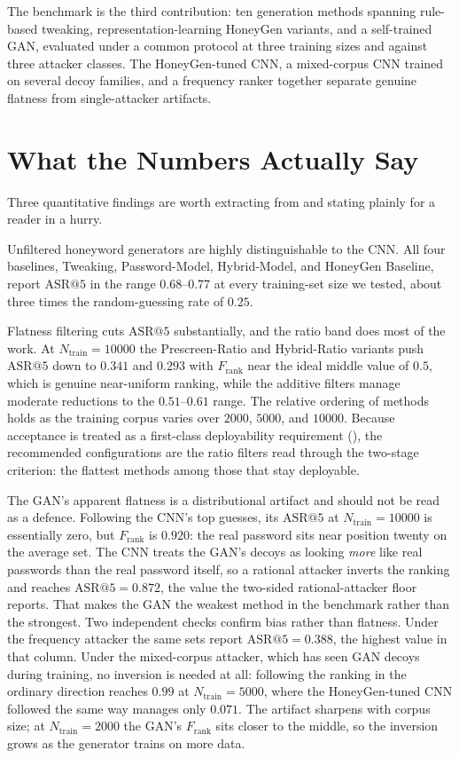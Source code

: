 The benchmark is the third contribution: ten generation methods spanning
rule-based tweaking, representation-learning HoneyGen variants, and a
self-trained GAN, evaluated under a common protocol at three training
sizes and against three attacker classes. The HoneyGen-tuned CNN, a
mixed-corpus CNN trained on several decoy families, and a frequency
ranker together separate genuine flatness from single-attacker
artifacts.

\section{What the Numbers Actually Say}

Three quantitative findings are worth extracting from 
and stating plainly for a reader in a hurry.

Unfiltered honeyword generators are highly distinguishable to the CNN.
All four baselines, Tweaking, Password-Model, Hybrid-Model, and HoneyGen
Baseline, report $\mathrm{ASR}@5$ in the range $0.68$--$0.77$ at every
training-set size we tested, about three times the random-guessing rate
of $0.25$.

Flatness filtering cuts $\mathrm{ASR}@5$ substantially, and the ratio
band does most of the work. At $N_{\text{train}} = 10000$ the
Prescreen-Ratio and Hybrid-Ratio variants push $\mathrm{ASR}@5$ down to
$0.341$ and $0.293$ with $F_{\text{rank}}$ near the ideal middle value
of $0.5$, which is genuine near-uniform ranking, while the additive
filters manage moderate reductions to the $0.51$--$0.61$ range. The
relative ordering of methods holds as the training corpus varies over
$2000$, $5000$, and $10000$. Because acceptance is treated as a
first-class deployability requirement (), the
recommended configurations are the ratio filters read through the
two-stage criterion: the flattest methods among those that stay
deployable.

The GAN's apparent flatness is a distributional artifact and should not
be read as a defence. Following the CNN's top guesses, its
$\mathrm{ASR}@5$ at $N_{\text{train}} = 10000$ is essentially zero, but
$F_{\text{rank}}$ is $0.920$: the real password sits near position
twenty on the average set. The CNN treats the GAN's decoys as looking
\emph{more} like real passwords than the real password itself, so a
rational attacker inverts the ranking and reaches
$\mathrm{ASR}@5 = 0.872$, the value the two-sided rational-attacker
floor reports. That makes the GAN the weakest method in the benchmark
rather than the strongest. Two independent checks confirm bias rather
than flatness. Under the frequency attacker the same sets report
$\mathrm{ASR}@5 = 0.388$, the highest value in that column. Under the
mixed-corpus attacker, which has seen GAN decoys during training, no
inversion is needed at all: following the ranking in the ordinary
direction reaches $0.99$ at $N_{\text{train}} = 5000$, where the
HoneyGen-tuned CNN followed the same way manages only $0.071$. The
artifact sharpens with corpus size; at $N_{\text{train}} = 2000$ the
GAN's $F_{\text{rank}}$ sits closer to the middle, so the inversion
grows as the generator trains on more data.


